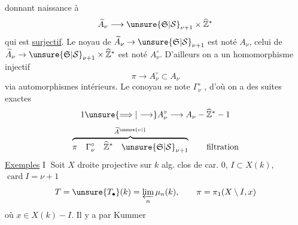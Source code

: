 donnant naissance à
\[
\widetilde A_\nu\longrightarrow\unsure{\mathfrak S|\mathcal S}_{\nu+1}\times\widehat{\mathbb Z}^{*}
\]
qui est \uline{surjectif}. Le noyau de $\widetilde A_\nu\to\unsure{\mathfrak S|\mathcal S}_{\nu+1}$
est noté $A_\nu$, celui de $\widetilde A_\nu\to\unsure{\mathfrak S|\mathcal S}_{\nu+1}\times\widehat{\mathbb Z}^{*}$
est noté $A_\nu^\circ$. D'ailleurs on a
un homomorphisme injectif
\[
\pi\longrightarrow A_\nu^\circ\subset A_\nu
\]
via automorphismes intérieurs. Le conoyau
se  note $\Gamma_\nu^\circ$ \inserted{($\Gamma_\nu$, $\widetilde\Gamma_\nu$)}, d'où on a des
suites exactes
\[
1\unsure{\Longrightarrow|\longrightarrow} A_\nu^\circ\longrightarrow A_\nu-\widehat{\mathbb Z}^{*}-1
\]
\[
\overbrace{\pi\quad\Gamma_\nu^\circ\quad\widehat{\mathbb Z}^{*}\quad\unsure{\mathfrak S|\mathcal S}_{\nu+1}}^{\widetilde A^{\unsure{\nu|\vphantom{\nu}}}}
\qquad\text{filtration}
\]
\uline{Exemples} \textcircled{I} Soit $X$ droite projective sur
$k$ alg. clos de car. $0$, $I\subset X(k)$, $\operatorname{card}I=\nu+1$
\[
T=\unsure{T_{\bullet}}(k)=\varprojlim_n\mu_n(k),\qquad
\pi=\pi_1(X\setminus I,x)
\]
où $x\in X(k)-I$. Il  y a par Kummer
